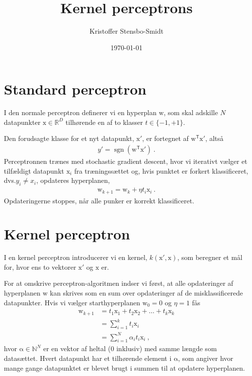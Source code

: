 \documentclass[10pt,twoside]{scrartcl}
\title{Kernel perceptrons}
\author{Kristoffer Stensbo-Smidt}
\date{\today}
\renewcommand{\vec}[1]{\bm{\mathrm{#1}}}        %
\newcommand{\T}{^\mathsf{T}}                    %
\newcommand{\R}{\mathbb R}
\newcommand{\N}{\mathbb N}
\DeclareMathOperator{\sgn}{sgn}                 %
\newcommand{\dvs}{dvs.\xspace}
\begin{document}
\maketitle
%

\section{Standard perceptron}
I den normale perceptron definerer vi en hyperplan $\vec w$, som skal adskille
$N$ datapunkter $\vec x \in \R^D$ tilhørende en af to klasser $t \in \{-1,
+1\}$.

Den forudsagte klasse for et nyt datapunkt, $\vec x'$, er fortegnet af $\vec w\T
\vec x'$, altså
\begin{align}
    \label{eq:prediction}
    y' = \sgn(\vec w\T\vec x')\ .
\end{align}
Perceptronnen trænes med stochastic gradient descent, hvor vi iterativt vælger
et tilfældigt datapunkt $\vec x_i$ fra træningssættet og, hvis punktet er
forkert klassificeret, \dvs $y_i \neq x_i$, opdateres hyperplanen,
\begin{align}
    \vec w_{k+1} = \vec w_{k} + \eta t_i \vec x_i\ .
\end{align}
Opdateringerne stoppes, når alle punker er korrekt klassificeret.

\section{Kernel perceptron}
I en kernel perceptron introducerer vi en kernel, $k(\vec x', \vec x)$, som
beregner et mål for, hvor ens to vektorer $\vec x'$ og $\vec x$ er.

For at omskrive perceptron-algoritmen indser vi først, at alle opdateringer af
hyperplanen $\vec w$ kan skrives som en sum over opdateringer af de
misklassificerede datapunkter. Hvis vi vælger starthyperplanen $\vec w_0 = \vec
0$ og $\eta = 1$ fås
\begin{align}
    \vec w_{k+1} &= t_1 \vec x_1 + t_2 \vec x_2 + \dots + t_k \vec x_k \\
                 &= \sum_{i = 1}^k t_i \vec x_i\\
                 &= \sum_{i = 1}^N \alpha_i t_i \vec x_i \ ,
\end{align}
hvor $\vec\alpha \in \N^N$ er en vektor af heltal (0 inklusiv) med samme længde
som datasættet. Hvert datapunkt har et tilhørende element i $\vec\alpha$, som
angiver hvor mange gange datapunktet er blevet brugt i summen til at opdatere
hyperplanen.
\end{document}
